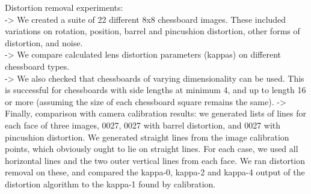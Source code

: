 Distortion removal experiments:\\
-> We created a suite of 22 different 8x8 chessboard images. These included variations on rotation, position, barrel and pincushion distortion, other forms of distortion, and noise.\\
-> We compare calculated  lens distortion parameters (kappas) on different chessboard types.\\
-> We also checked that chessboards of varying dimensionality can be used. This is successful for chessboards with side lengths at minimum 4, and up to length 16 or more (assuming the size of each chessboard square remains the same).
-> Finally, comparison with camera calibration results: we generated lists of lines for each face of three images, 0027, 0027 with barrel distortion, and 0027 with pincushion distortion. We generated straight lines from the image calibration points, which obviously ought to lie on straight lines. For each case, we used all horizontal lines and the two outer vertical lines from each face. We ran distortion removal on these, and compared the kappa-0, kappa-2 and kappa-4 output of the distortion algorithm to the kappa-1 found by calibration.\\

